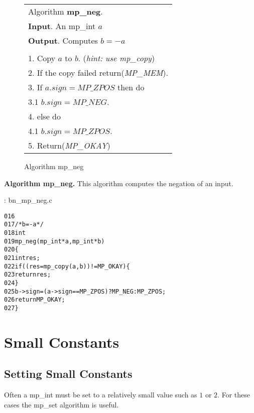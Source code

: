 \documentclass[b5paper]{book}
\begin{document}
\newpage\begin{figure}[here]
\begin{center}
\begin{tabular}{l}
\hline Algorithm \textbf{mp\_neg}. \\
\textbf{Input}.   An mp\_int $a$ \\
\textbf{Output}.  Computes $b = -a$ \\
\hline \\
1.  Copy $a$ to $b$.  (\textit{hint: use mp\_copy}) \\
2.  If the copy failed return(\textit{MP\_MEM}). \\
3.  If $a.sign = MP\_ZPOS$ then do \\
\hspace{3mm}3.1  $b.sign = MP\_NEG$. \\
4.  else do \\
\hspace{3mm}4.1  $b.sign = MP\_ZPOS$. \\
5.  Return(\textit{MP\_OKAY}) \\
\hline
\end{tabular}
\end{center}
\caption{Algorithm mp\_neg}
\end{figure}

\textbf{Algorithm mp\_neg.}
This algorithm computes the negation of an input.  

\vspace{+3mm}\begin{small}
\hspace{-5.1mm}{\bf File}: bn\_mp\_neg.c
\vspace{-3mm}
\begin{alltt}
016   
017   /* b = -a */
018   int
019   mp_neg (mp_int * a, mp_int * b)
020   \{
021     int     res;
022     if ((res = mp_copy (a, b)) != MP_OKAY) \{
023       return res;
024     \}
025     b->sign = (a->sign == MP_ZPOS) ? MP_NEG : MP_ZPOS;
026     return MP_OKAY;
027   \}
\end{alltt}
\end{small}

\section{Small Constants}
\subsection{Setting Small Constants}
Often a mp\_int must be set to a relatively small value such as $1$ or $2$.  For these cases the mp\_set algorithm is useful.
\end{document}
